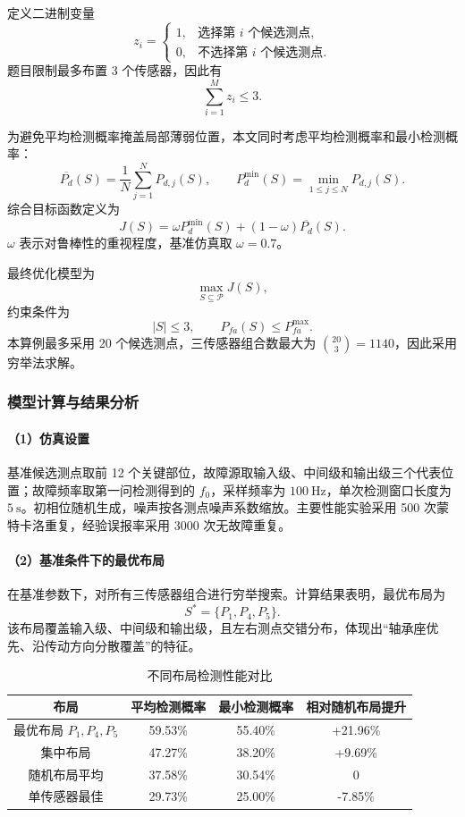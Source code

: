 \documentclass[UTF8,a4paper,12pt]{ctexart}
\numberwithin{figure}{section}
\numberwithin{table}{section}
\begin{document}
定义二进制变量
\[
z_i=
\begin{cases}
1, & \text{选择第 }i\text{ 个候选测点},\\
0, & \text{不选择第 }i\text{ 个候选测点}.
\end{cases}
\]
题目限制最多布置 3 个传感器，因此有
\[
\sum_{i=1}^{M}z_i\leq3.
\]

为避免平均检测概率掩盖局部薄弱位置，本文同时考虑平均检测概率和最小检测概率：
\[
\overline{P_d}(S)=\frac{1}{N}\sum_{j=1}^{N}P_{d,j}(S),
\qquad
P_d^{\min}(S)=\min_{1\leq j\leq N}P_{d,j}(S).
\]
综合目标函数定义为
\[
J(S)=\omega P_d^{\min}(S)+(1-\omega)\overline{P_d}(S).
\]
\(\omega\) 表示对鲁棒性的重视程度，基准仿真取 \(\omega=0.7\)。

最终优化模型为
\[
\max_{S\subseteq\mathcal P}J(S),
\]
约束条件为
\[
|S|\leq3,\qquad P_{fa}(S)\leq P_{fa}^{\max}.
\]
本算例最多采用 20 个候选测点，三传感器组合数最大为 \(\binom{20}{3}=1140\)，因此采用穷举法求解。

\subsubsection{模型计算与结果分析}

\paragraph{（1）仿真设置}

基准候选测点取前 12 个关键部位，故障源取输入级、中间级和输出级三个代表位置；故障频率取第一问检测得到的 \(f_0\)，采样频率为 \(100\ \mathrm{Hz}\)，单次检测窗口长度为 \(5\ \mathrm{s}\)。初相位随机生成，噪声按各测点噪声系数缩放。主要性能实验采用 500 次蒙特卡洛重复，经验误报率采用 3000 次无故障重复。

\paragraph{（2）基准条件下的最优布局}

在基准参数下，对所有三传感器组合进行穷举搜索。计算结果表明，最优布局为
\[
S^\ast=\{P_1,P_4,P_5\}.
\]
该布局覆盖输入级、中间级和输出级，且左右测点交错分布，体现出“轴承座优先、沿传动方向分散覆盖”的特征。

\begin{table}[H]
\centering
\caption{不同布局检测性能对比}
\begin{tabular}{cccc}
\toprule
布局 & 平均检测概率 & 最小检测概率 & 相对随机布局提升\\
\midrule
最优布局 \(P_1,P_4,P_5\) & 59.53\% & 55.40\% & +21.96\%\\
集中布局 & 47.27\% & 38.20\% & +9.69\%\\
随机布局平均 & 37.58\% & 30.54\% & 0\\
单传感器最佳 & 29.73\% & 25.00\% & -7.85\%\\
\bottomrule
\end{tabular}
\end{table}
\end{document}
